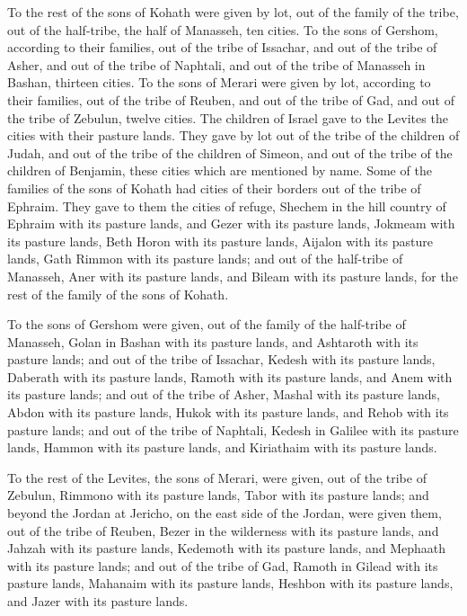{\par }{\PP {}To the rest of the sons of Kohath were given by lot, out of the family of the tribe, out of the half-tribe, the half of Manasseh, ten cities.
To the sons of Gershom, according to their families, out of the tribe of Issachar, and out of the tribe of Asher, and out of the tribe of Naphtali, and out of the tribe of Manasseh in Bashan, thirteen cities.
To the sons of Merari were given by lot, according to their families, out of the tribe of Reuben, and out of the tribe of Gad, and out of the tribe of Zebulun, twelve cities.
The children of Israel gave to the Levites the cities with their pasture lands.
They gave by lot out of the tribe of the children of Judah, and out of the tribe of the children of Simeon, and out of the tribe of the children of Benjamin, these cities which are mentioned by name.
Some of the families of the sons of Kohath had cities of their borders out of the tribe of Ephraim.
They gave to them the cities of refuge, Shechem in the hill country of Ephraim with its pasture lands, and Gezer with its pasture lands,
Jokmeam with its pasture lands, Beth Horon with its pasture lands,
Aijalon with its pasture lands, Gath Rimmon with its pasture lands;
and out of the half-tribe of Manasseh, Aner with its pasture lands, and Bileam with its pasture lands, for the rest of the family of the sons of Kohath.
\par }{\PP {}To the sons of Gershom were given, out of the family of the half-tribe of Manasseh, Golan in Bashan with its pasture lands, and Ashtaroth with its pasture lands;
and out of the tribe of Issachar, Kedesh with its pasture lands, Daberath with its pasture lands,
Ramoth with its pasture lands, and Anem with its pasture lands;
and out of the tribe of Asher, Mashal with its pasture lands, Abdon with its pasture lands,
Hukok with its pasture lands, and Rehob with its pasture lands;
and out of the tribe of Naphtali, Kedesh in Galilee with its pasture lands, Hammon with its pasture lands, and Kiriathaim with its pasture lands.
\par }{\PP {}To the rest of the Levites, the sons of Merari, were given, out of the tribe of Zebulun, Rimmono with its pasture lands, Tabor with its pasture lands;
and beyond the Jordan at Jericho, on the east side of the Jordan, were given them, out of the tribe of Reuben, Bezer in the wilderness with its pasture lands, and Jahzah with its pasture lands,
Kedemoth with its pasture lands, and Mephaath with its pasture lands;
and out of the tribe of Gad, Ramoth in Gilead with its pasture lands, Mahanaim with its pasture lands,
Heshbon with its pasture lands, and Jazer with its pasture lands.

}
